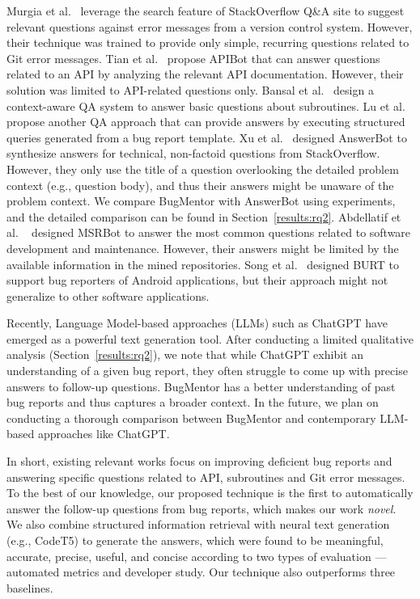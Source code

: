Murgia et al.~\cite{murgia2016among} leverage the search feature of StackOverflow Q\&A site to suggest relevant questions against error messages from a version control system. However, their technique was trained to provide only simple, recurring questions related to Git error messages. Tian et al.~\cite{tian2017apibot} propose APIBot that can answer questions related to an API by analyzing the relevant API documentation. However, their solution was limited to API-related questions only. Bansal et al.~\cite{bansal2021neural} design a context-aware QA system to answer basic questions about subroutines. Lu et al.~\cite{lu2021beat} propose another QA approach that can provide answers by executing structured queries generated from a bug report template. Xu et al.~\cite{xu2017answerbot} designed AnswerBot to synthesize answers for technical, non-factoid questions from StackOverflow. 
However, they only use the title of a question overlooking the detailed problem context (e.g., question body), and thus their answers might be unaware of the problem context. We compare BugMentor with AnswerBot using experiments, and the detailed comparison can be found in Section~\ref{results:rq2}. Abdellatif et al. ~\cite{abdellatif2020msrbot} designed MSRBot to answer the most common questions related to software development and maintenance. However, their answers might be limited by the available information in the mined repositories. Song et al.~\cite{song2022toward} designed BURT to support bug reporters of Android applications, but their approach might not generalize to other software applications.

Recently, Language Model-based approaches (LLMs) such as ChatGPT have emerged as a powerful text generation tool. After conducting a limited qualitative analysis (Section~\ref{results:rq2}), we note that while ChatGPT exhibit an understanding of a given bug report, they often struggle to come up with precise answers to follow-up questions. BugMentor has a better understanding of past bug reports and thus captures a broader context. In the future, we plan on conducting a thorough comparison between BugMentor and contemporary LLM-based approaches like ChatGPT.


In short, existing relevant works focus on improving deficient bug reports and answering specific questions related to API, subroutines and Git error messages. 
To the best of our knowledge, our proposed technique is the first to automatically answer the follow-up questions from bug reports, which makes our work \emph{novel}. We also combine structured information retrieval with neural text generation (e.g., CodeT5) to generate the answers, which were found to be meaningful, accurate, precise, useful, and concise according to two types of evaluation --- automated metrics and developer study. Our technique also outperforms three baselines.  


